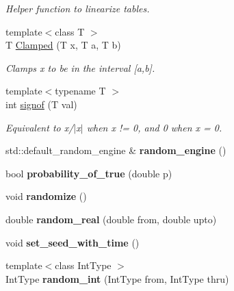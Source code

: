 \begin{DoxyCompactItemize}
\begin{DoxyCompactList}\small\item\em Helper function to linearize tables. \end{DoxyCompactList}\item 
\hypertarget{namespacedscr_a531a0bd6f8c8b45ae074e52a3ed63ee6}{{\footnotesize template$<$class T $>$ }\\T \hyperlink{namespacedscr_a531a0bd6f8c8b45ae074e52a3ed63ee6}{Clamped} (T x, T a, T b)}\label{namespacedscr_a531a0bd6f8c8b45ae074e52a3ed63ee6}

\begin{DoxyCompactList}\small\item\em Clamps x to be in the interval \mbox{[}a,b\mbox{]}. \end{DoxyCompactList}\item 
{\footnotesize template$<$typename T $>$ }\\int \hyperlink{namespacedscr_a64a805545da240fdb87bee89d0f736de}{signof} (T val)
\begin{DoxyCompactList}\small\item\em Equivalent to x/$|$x$|$ when x != 0, and 0 when x = 0. \end{DoxyCompactList}\item 
\hypertarget{namespacedscr_ad52b1d4d7732aabc578e7891c3a5d8b6}{std\-::default\-\_\-random\-\_\-engine \& {\bfseries random\-\_\-engine} ()}\label{namespacedscr_ad52b1d4d7732aabc578e7891c3a5d8b6}

\item 
\hypertarget{namespacedscr_a1818965fe56958547d1384de8909f306}{bool {\bfseries probability\-\_\-of\-\_\-true} (double p)}\label{namespacedscr_a1818965fe56958547d1384de8909f306}

\item 
\hypertarget{namespacedscr_ac15072d09f6c00c9c6bca0db99728e50}{void {\bfseries randomize} ()}\label{namespacedscr_ac15072d09f6c00c9c6bca0db99728e50}

\item 
\hypertarget{namespacedscr_a1bafc342efcc23bf82da84771ce29f34}{double {\bfseries random\-\_\-real} (double from, double upto)}\label{namespacedscr_a1bafc342efcc23bf82da84771ce29f34}

\item 
\hypertarget{namespacedscr_ad2d6f27a4e630bfebd9451d009a63fed}{void {\bfseries set\-\_\-seed\-\_\-with\-\_\-time} ()}\label{namespacedscr_ad2d6f27a4e630bfebd9451d009a63fed}

\item 
\hypertarget{namespacedscr_a764d98337351775b8406f6ecaa270669}{{\footnotesize template$<$class Int\-Type $>$ }\\Int\-Type {\bfseries random\-\_\-int} (Int\-Type from, Int\-Type thru)}\label{namespacedscr_a764d98337351775b8406f6ecaa270669}


\end{DoxyCompactItemize}
